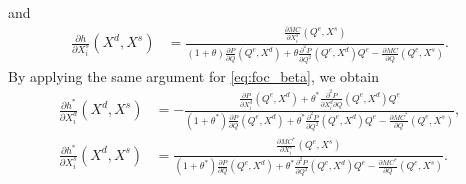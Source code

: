 \documentclass[11pt, a4paper]{article}
\theoremstyle{remark}
\begin{document}
and
\begin{align}
    \frac{\partial h}{\partial X^{s}_{i}}(X^{d}, X^{s}) & = \frac{\frac{\partial MC}{\partial X^{s}_{i}}(Q^e, X^{s})}{(1+\theta)\frac{\partial P}{\partial Q}(Q^e, X^{d}) + \theta\frac{\partial^2 P}{\partial Q^2}(Q^e, X^{d})Q^e - \frac{\partial MC}{\partial Q}(Q^e, X^{s})}. \label{eq:foc_derivative_supply}
\end{align}
By applying the same argument for \eqref{eq:foc_beta}, we obtain 
\begin{align}
    \frac{\partial h^{*}}{\partial X^{d}_{i}}(X^{d}, X^{s}) &= -\frac{\frac{\partial P}{\partial X^{d}_{i}}(Q^e, X^{d}) + \theta^{*}\frac{\partial^2 P}{\partial X^{d}_{i}\partial Q}(Q^e, X^{d})Q^e }{(1+\theta^{*})\frac{\partial P}{\partial Q}(Q^e, X^{d}) + \theta^{*}\frac{\partial^2 P}{\partial Q^2}(Q^e, X^{d})Q^e - \frac{\partial MC^{*}}{\partial Q}(Q^e, X^{s})}, \\
    \frac{\partial h^{*}}{\partial X^{s}_{i}}(X^{d}, X^{s}) & = \frac{\frac{\partial MC^{*}}{\partial X^{s}_{i}}(Q^e, X^{s})}{(1+\theta^{*})\frac{\partial P}{\partial Q}(Q^e, X^{d}) + \theta^{*}\frac{\partial^2 P}{\partial Q^2}(Q^e, X^{d})Q^e - \frac{\partial MC^{*}}{\partial Q}(Q^e, X^{s})}.
\end{align}
\end{document}
